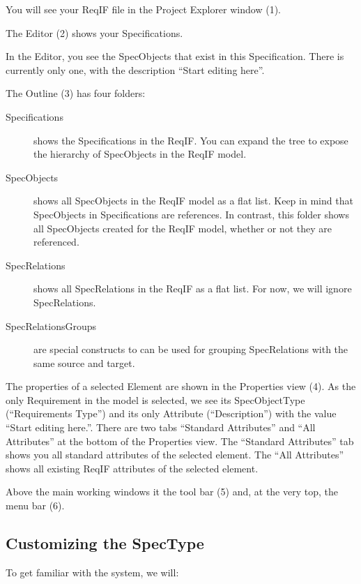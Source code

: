 You will see your ReqIF file in the Project Explorer window (1).

The Editor (2) shows your Specifications.

In the Editor, you see the SpecObjects that exist in this Specification.  There is currently only one, with the description ``Start editing here''.

The Outline (3) has four folders:

\begin{description}
\item[Specifications] shows the Specifications in the ReqIF.  You can expand the tree to expose the hierarchy of SpecObjects in the ReqIF model.
\item[SpecObjects] shows all SpecObjects in the ReqIF model as a flat list.  Keep in mind that SpecObjects in Specifications are references.  In contrast, this folder shows all SpecObjects created for the ReqIF model, whether or not they are referenced.
\item[SpecRelations] shows all SpecRelations in the ReqIF as a flat list.  For now, we will ignore SpecRelations.
\item[SpecRelationsGroups] are special constructs to can be used for grouping SpecRelations with the same source and target.
\end{description}

The properties of a selected Element are shown in the Properties view (4).  As the only Requirement in the model is selected, we see its SpecObjectType (``Requirements Type'') and its only Attribute (``Description'') with the value ``Start editing here.''.  There are two tabs ``Standard Attributes'' and ``All Attributes'' at the bottom of the Properties view.  The ``Standard Attributes'' tab shows you all standard attributes of the selected element.  The ``All Attributes'' shows all existing ReqIF attributes of the selected element.

Above the main working windows it the tool bar (5) and, at the very top, the menu bar (6).

\subsection{Customizing the SpecType}

To get familiar with the system, we will:


